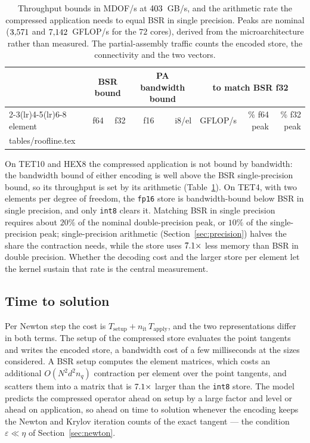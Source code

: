 \documentclass[sigconf,balance=false]{acmart}
\makeatletter
\newcommand{\rows}[1]{\@@input #1 }
\newcommand{\eps}{\varepsilon}
\makeatother
\begin{document}
\begin{table}[t]
\centering
\begin{tabular}{lrrrrrrr}
\toprule
 & \multicolumn{2}{c}{BSR bound} & \multicolumn{2}{c}{PA bandwidth bound} & \multicolumn{3}{c}{to match BSR f32} \\
\cmidrule(lr){2-3}\cmidrule(lr){4-5}\cmidrule(lr){6-8}
element & f64 & f32 & f16 & i8/el & GFLOP/s & \% f64 peak & \% f32 peak \\
\midrule
\rows{tables/roofline.tex}
\bottomrule
\end{tabular}
\caption{Throughput bounds in MDOF/s at $403$~GB/s, and the arithmetic rate the
compressed application needs to equal BSR in single precision.  Peaks are nominal
($3{,}571$ and $7{,}142$~GFLOP/s for the $72$ cores), derived from the
microarchitecture rather than measured.  The partial-assembly traffic counts the encoded store, the
connectivity and the two vectors.}
\label{tab:roofline}
\end{table}

On TET10 and HEX8 the compressed application is not bound by bandwidth: the bandwidth bound of
either encoding is well above the BSR single-precision bound, so its throughput is set by its
arithmetic (Table~\ref{tab:roofline}).  On TET4, with two elements per degree of freedom, the
\texttt{fp16} store is bandwidth-bound below BSR in single precision, and only \texttt{int8} clears
it.  Matching BSR in single precision requires about $20\%$ of the nominal
double-precision peak, or $10\%$ of the single-precision peak; single-precision arithmetic
(Section~\ref{sec:precision}) halves the share the contraction needs, while the store uses
$7.1\times$ less memory than BSR in double precision.  Whether the decoding cost and
the larger store per element let the kernel sustain that rate is the central measurement.

\subsection{Time to solution}

Per Newton step the cost is $T_{\mathrm{setup}} + n_{\mathrm{it}}\,T_{\mathrm{apply}}$, and the
two representations differ in both terms.  The setup of the compressed store evaluates the point
tangents and writes the encoded store, a bandwidth cost of a few milliseconds at the sizes
considered.  A BSR setup computes the element matrices, which costs an additional
$O(N^2 d^2 n_q)$ contraction per element over the point tangents, and scatters them into a matrix
that is $7.1\times$ larger than the \texttt{int8} store.  The model predicts the
compressed operator ahead on setup by a large factor and level or ahead on application, so ahead
on time to solution whenever the encoding keeps the Newton and Krylov iteration counts of the exact
tangent --- the condition $\eps\ll\eta$ of Section~\ref{sec:newton}.
\end{document}
